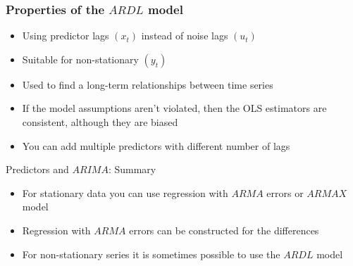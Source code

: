 \begin{frame}
	\frametitle{Properties of the $ARDL$ model}
	\begin{itemize}[<+->]
		\item Using \alert{predictor lags} $(x_t)$ instead of noise lags $(u_t)$ 
		\item Suitable for \alert{non-stationary} $(y_t)$
		\item Used to find a \alert{long-term relationships} between time series
		\item If  the model assumptions aren't violated, then \alert{the OLS estimators are consistent}, although they are biased
		\item You can add \alert{multiple predictors} with different number of lags
	\end{itemize}
	
\end{frame}


\begin{frame}{Predictors and $ARIMA$: Summary}
	\begin{itemize}[<+->]
		\item For \alert{stationary data} you can use regression with $ARMA$ errors or $ARMAX$ model
		\item Regression with $ARMA$ errors can be constructed for the   \alert{differences}
		\item For \alert{non-stationary series} it is sometimes possible to use the $ARDL$ model
	\end{itemize}
	
\end{frame}
